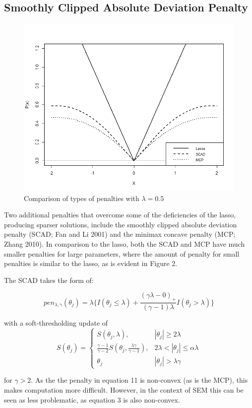 \documentclass[article]{jss}
\begin{document}
\subsection{Smoothly Clipped Absolute Deviation
Penalty}\label{smoothly-clipped-absolute-deviation-penalty}

\begin{figure}
    \centering
    \includegraphics[width=.5\linewidth]{figs/penalties}
    \caption{Comparison of types of penalties with $\lambda=0.5$}
\end{figure}

Two additional penalties that overcome some of the deficiencies of the
lasso, producing sparser solutions, include the smoothly clipped
absolute deviation penalty (SCAD; Fan and Li 2001) and the minimax
concave penalty (MCP; Zhang 2010). In comparison to the lasso, both the
SCAD and MCP have much smaller penalties for large parameters, where the
amount of penalty for small penalties is similar to the lasso, as is
evident in Figure 2.

The SCAD takes the form of:

\[
pen_{\lambda,\gamma}(\theta_{j}) = \lambda \big\{I(\theta_{j}\leq\lambda) + \frac{(\gamma \lambda-0)_{+}}{(\gamma-1)\lambda}I(\theta_{j}>\lambda)\big\}
\]

\noindent
with a soft-thresholding update of \[
S(\theta_{j})= 
\begin{cases}
S(\theta_{j},\lambda),&  |\theta_{j}| \geq 2\lambda\\
\frac{\gamma-1}{\gamma-2}S(\theta_{j},\frac{\lambda\gamma}{\gamma-1}),              & 2\lambda < |\theta_{j}|\leq\alpha\lambda\\
\theta_{j} & |\theta_{j}| > \lambda \gamma
\end{cases}
\]

\noindent
for \(\gamma > 2\). As the the penalty in equation 11 is non-convex (as
is the MCP), this makes computation more difficult. However, in the
context of SEM this can be seen as less problematic, as equation 3 is
also non-convex.
\end{document}
